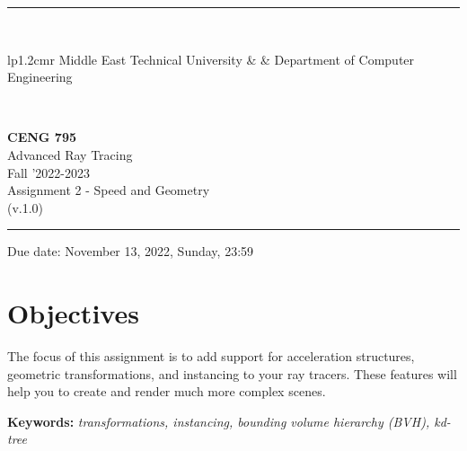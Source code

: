 \documentclass[12pt]{article}
\newcommand{\HRule}{\rule{\linewidth}{1mm}}
\begin{document}
\noindent \HRule \\[3mm]
\small
\begin{tabular}[b]{lp{1.2cm}r}
\href{https://www.metu.edu.tr/}{} Middle East Technical
University &  &
\href{https://ceng.metu.edu.tr/information}{} Department of Computer Engineering \\
\end{tabular} \\
\begin{center}

                 \LARGE \textbf{CENG 795} \\[4mm]
                 \Large Advanced Ray Tracing \\[4mm]
                \normalsize Fall '2022-2023 \\
                    \normalsize Assignment 2 - Speed and Geometry \\
                    \normalsize (v.1.0)
\end{center}
\HRule

\begin{center}
Due date: November 13, 2022, Sunday, 23:59
\end{center}


\section{Objectives}
The focus of this assignment is to add support for acceleration
structures, geometric transformations, and instancing to your ray
tracers. These features will help you to create and render much more
complex scenes.

\vspace{0.5cm} \noindent \textbf{Keywords:} \emph{transformations,
    instancing, bounding volume hierarchy (BVH), kd-tree}
\end{document}

